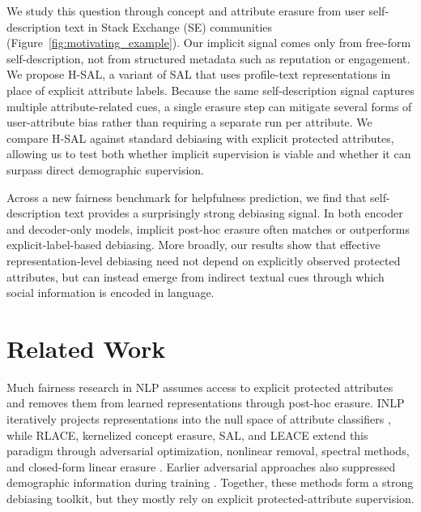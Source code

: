 \documentclass[11pt]{article}
\begin{document}
We study this question through concept and attribute erasure from user self-description text in Stack Exchange (SE) communities (Figure~\ref{fig:motivating_example}). Our implicit signal comes only from free-form self-description, not from structured metadata such as reputation or engagement. We propose H-\textsc{SAL}, a variant of SAL \citep{shao-etal-2022-SAL} that uses profile-text representations in place of explicit attribute labels. Because the same self-description signal captures multiple attribute-related cues, a single erasure step can mitigate several forms of user-attribute bias rather than requiring a separate run per attribute. We compare H-\textsc{SAL} against standard debiasing with explicit protected attributes, allowing us to test both whether implicit supervision is viable and whether it can surpass direct demographic supervision.



Across a new fairness benchmark for helpfulness prediction, we find that self-description text provides a surprisingly strong debiasing signal. In both encoder and decoder-only models, implicit post-hoc erasure often matches or outperforms explicit-label-based debiasing. More broadly, our results show that effective representation-level debiasing need not depend on explicitly observed protected attributes, but can instead emerge from indirect textual cues through which social information is encoded in language.






\section{Related Work}






Much fairness research in NLP assumes access to explicit protected attributes and removes them from learned representations through post-hoc erasure. INLP iteratively projects representations into the null space of attribute classifiers \citep{ravfogel-etal-2020-null}, while RLACE, kernelized concept erasure, SAL, and LEACE extend this paradigm through adversarial optimization, nonlinear removal, spectral methods, and closed-form linear erasure \citep{ravfogel22-LACE,shauli-2022-adversarial,shao-etal-2022-SAL,nora-etal-leace}. Earlier adversarial approaches also suppressed demographic information during training \citep{edwards2015censoring,coavoux-etal-2018-privacy,elazar-goldberg-2018-adversarial,barrett-etal-2019-adversarial}. Together, these methods form a strong debiasing toolkit, but they mostly rely on explicit protected-attribute supervision.
\end{document}
